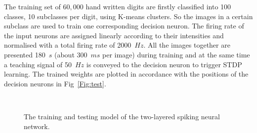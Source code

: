 The training set of $60,000$ hand written digits are firstly classified into 100 classes, 10 subclasses per digit, using K-means clusters.
So the images in a certain subclass are used to train one corresponding decision neuron.
The firing rate of the input neurons are assigned linearly according to their intensities and normalised with a total firing rate of 2000~$Hz$.
All the images together are presented 180~$s$ (about 300~$ms$ per image) during training and at the same time a teaching signal of 50~$Hz$ is conveyed to the decision neuron to trigger STDP learning.
The trained weights are plotted in accordance with the positions of the decision neurons in Fig~\ref{Fig:test}.
\begin{figure}[thb!]
	\centering
	 \\

	\centering
	
		
	\caption{The training and testing model of the two-layered spiking neural network.}
	\label{fig:model}
\end{figure} 



